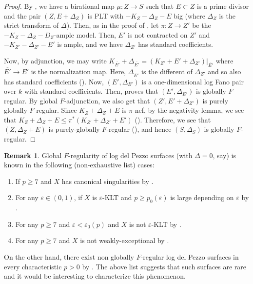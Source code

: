 \documentclass[11pt,reqno]{amsart}
\numberwithin{equation}{section}
\theoremstyle{definition}
\newtheorem{rem}[prop] {Remark}
\begin{document}
\begin{proof}
    By , we have a birational map $\mu: Z \to S$ such that $E \subset Z$ is a prime divisor and the pair $(Z, E + \Delta_Z )$ is PLT with $ - K_Z - \Delta_Z - E$ big (where $\Delta_Z$ is the strict transform of $\Delta$). Then, as in the proof of , let $\pi: Z \to Z'$ be the $- K_Z - \Delta_Z - D_Z$-ample model. Then, $E'$ is not contracted on $Z'$ and $- K_{Z'} - \Delta_{Z'} - E'$ is ample, and we have $\Delta_{Z'}$ has standard coefficients.
    
    Now, by adjunction, we may write $K_{\overline{E'}} + \Delta_{\overline{E'}} = (K_{Z'} + E' + \Delta_{Z'})|_{\overline{E'}} $ where $\overline {E'} \to E'$ is the normalization map. Here, $\Delta_{\overline{E'}}$ is the different of $\Delta_{Z'}$ and so also has standard coefficients (\cite[Lemma 4.1]{HaconMckernanXuACCforLCT}). Now, $(E', \Delta_{E'})$ is a one-dimensional log Fano pair over $k$ with standard coefficients. Then, \cite[Theorem 4.2]{WatanabeFregularFpureRings} proves that $(E', \Delta_{E'})$ is globally $F$-regular. By global $F$-adjunction, we also get that $(Z', E' + \Delta_{Z'})$ is purely globally $F$-regular. Since $K_Z + \Delta_Z + E$ is $\pi$-nef, by the negativity lemma, we see that $K_Z + \Delta_Z + E \leq \pi^*(K_{Z'} + \Delta_{Z'} + E')$ (). Therefore, we see that $(Z, \Delta_{Z} + E)$ is purely-globally $F$-regular (), and hence $(S, \Delta_S)$ is globally $F$-regular.
\end{proof}

\begin{rem}
    Global $F$-regularity of log del Pezzo surfaces (with $\Delta = 0$, say) is known in the following (non-exhaustive list) cases:
    \begin{enumerate}
        \item If $p \geq 7$ and $X$ has canonical singularities by \cite{KawakamiTanakaGlobalFregularity}.

        \item For any $\varepsilon \in (0,1)$, if $X$ is $\varepsilon$-KLT and $p \geq p_0 (\varepsilon)$ is large depending on $\varepsilon$ by \cite[Section 3]{CTW17}.

        \item For any $p \geq 7$ and $\varepsilon < \varepsilon_0 (p)$ and $X$ is not $\varepsilon$-KLT by \cite[Section 5]{CTW17}.

        \item For any $p \geq 7$ and $X$ is not weakly-exceptional by .
    \end{enumerate}

    On the other hand, there exist non globally $F$-regular log del Pezzo surfaces in every characteristic $p>0$ by \cite{CasciniTanakaWitaszekcounterexamplestoFregularity}. The above list suggests that such surfaces are rare and it would be interesting to characterize this phenomenon.
\end{rem}
 
\end{document}
